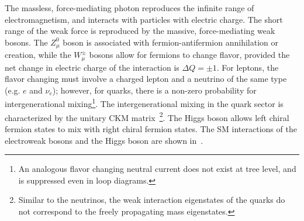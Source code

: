 The massless, force-mediating photon reproduces the infinite range of electromagnetism, and interacts with particles with electric charge. The short range of the weak force is reproduced by the massive, force-mediating weak bosons. The $Z^0_{\mu}$ boson is associated with fermion-antifermion annihilation or creation, while the $W^{\pm}_{\mu}$ bosons allow for fermions to change flavor, provided the net change in electric charge of the interaction is $\Delta Q = \pm1$. For leptons, the flavor changing must involve a charged lepton and a neutrino of the same type (e.g. $e$ and $\nu_e$); however, for quarks, there is a non-zero probability for intergenerational mixing\footnote{
	An analogous flavor changing neutral current does not exist at tree level, and is suppressed even in loop diagrams.
}. The intergenerational mixing in the quark sector is characterized by the unitary CKM matrix~\cite{Cabibbo, kob_mas}\footnote{
	Similar to the neutrinos, the weak interaction eigenstates of the quarks do not correspond to the freely propagating mass eigenstates.
}. The Higgs boson allows left chiral fermion states to mix with right chiral fermion states. The SM interactions of the electroweak bosons and the Higgs boson are shown in~\Figs{\ref{fig:feyn_weak}}{\ref{fig:feyn_higgs}}.
